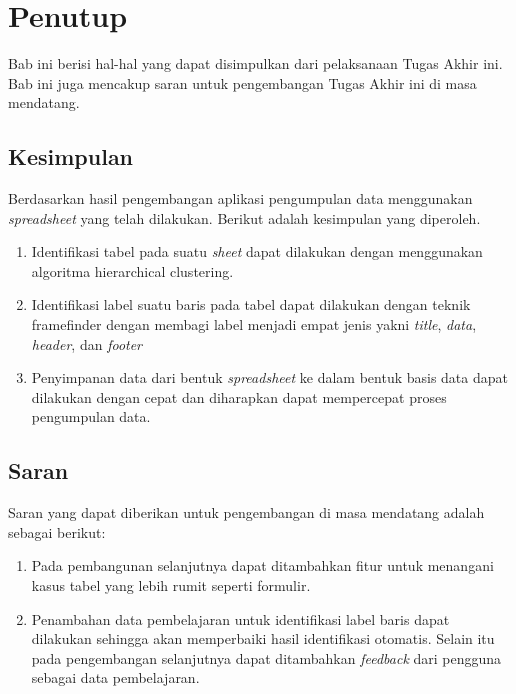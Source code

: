 \chapter{Penutup}
Bab ini berisi hal-hal yang dapat disimpulkan dari pelaksanaan Tugas Akhir ini. Bab ini juga mencakup saran untuk pengembangan Tugas Akhir ini di masa mendatang.

\section{Kesimpulan}
Berdasarkan hasil pengembangan aplikasi pengumpulan data menggunakan \textit{spreadsheet} yang telah dilakukan. Berikut adalah kesimpulan yang diperoleh.
\begin{enumerate}
	\item Identifikasi tabel pada suatu \textit{sheet} dapat dilakukan dengan menggunakan algoritma hierarchical clustering.
	\item Identifikasi label suatu baris pada tabel dapat dilakukan dengan teknik framefinder dengan membagi label menjadi empat jenis yakni \textit{title}, \textit{data}, \textit{header}, dan \textit{footer}
	\item Penyimpanan data dari bentuk \textit{spreadsheet} ke dalam bentuk basis data dapat dilakukan dengan cepat dan diharapkan dapat mempercepat proses pengumpulan data.
\end{enumerate}

\section{Saran}
Saran yang dapat diberikan untuk pengembangan di masa mendatang adalah sebagai berikut:
\begin{enumerate}
	\item Pada pembangunan selanjutnya dapat ditambahkan fitur untuk menangani kasus tabel yang lebih rumit seperti formulir.
	\item Penambahan data pembelajaran untuk identifikasi label baris dapat dilakukan sehingga akan memperbaiki hasil identifikasi otomatis. Selain itu pada pengembangan selanjutnya dapat ditambahkan \textit{feedback} dari pengguna sebagai data pembelajaran.
\end{enumerate}